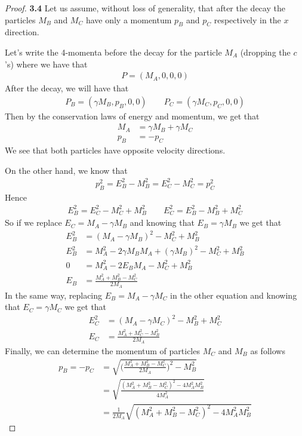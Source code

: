 \documentclass[11pt]{article}
\theoremstyle{definition}
\begin{document}
\begin{proof}{\textbf{3.4}}
    Let us assume, without loss of generality, that after the decay the
    particles $M_B$ and $M_C$ have only a momentum $p_B$ and $p_C$ respectively
    in the $x$ direction.

    Let's write the 4-momenta before the decay for the particle $M_A$
    (dropping the $c$'s) where we have that
    \begin{align*}
        P = (M_A, 0, 0, 0)
    \end{align*}
    After the decay, we will have that
    \begin{align*}
        P_B = (\gamma M_B, p_B, 0, 0)\qquad P_C = (\gamma M_C, p_C, 0, 0)        
    \end{align*}
    Then by the conservation laws of energy and momentum, we get that
    \begin{align*}
        M_A &= \gamma M_B + \gamma M_C\\
        p_B &= -p_C
    \end{align*}
    We see that both particles have opposite velocity directions.

    On the other hand, we know that
    \begin{align*}
        p_B^2 = E_B^2 - M_B^2 = E_C^2 - M_C^2 = p_C^2
    \end{align*}
    Hence
    \begin{align*}
        E_B^2 = E_C^2 - M_C^2 + M_B^2\qquad E_C^2 = E_B^2 - M_B^2 + M_C^2
    \end{align*}
    So if we replace $E_C = M_A - \gamma M_B$ and knowing that
    $E_B = \gamma M_B$ we get that
    \begin{align*}
        E_B^2 &= (M_A - \gamma M_B)^2 - M_C^2 + M_B^2\\
        E_B^2 &= M_A^2 - 2\gamma M_BM_A + (\gamma M_B)^2 - M_C^2 + M_B^2\\
        0 &= M_A^2 - 2E_BM_A - M_C^2 + M_B^2\\
        E_B &= \frac{M_A^2 + M_B^2 - M_C^2}{2M_A}
    \end{align*}
    In the same way, replacing $E_B = M_A - \gamma M_C$ in the other equation
    and knowing that $E_C = \gamma M_C$ we get that
    \begin{align*}
        E_C^2 &= (M_A - \gamma M_C)^2 - M_B^2 + M_C^2\\
        E_C &= \frac{M_A^2 + M_C^2 - M_B^2}{2M_A}
    \end{align*}
    Finally, we can determine the momentum of particles $M_C$ and $M_B$ as
    follows
    \begin{align*}
        p_B = -p_C &= \sqrt{
            \bigg(\frac{M_A^2 + M_B^2 - M_C^2}{2M_A}\bigg)^2
            - M_B^2
        }\\
        &= \sqrt{
            \frac{(M_A^2 + M_B^2 - M_C^2)^2 - 4M_A^2M_B^2}{4M_A^2}
        }\\
        &= \frac{1}{2M_A} \sqrt{(M_A^2 + M_B^2 - M_C^2)^2 - 4M_A^2M_B^2}
    \end{align*}


\end{proof}
\end{document}
